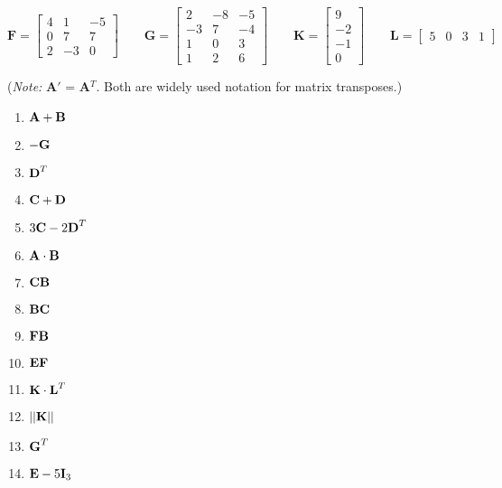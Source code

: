 \documentclass[12pt]{article}
\begin{document}
\begin{equation*}
\textbf{F} = \left[\begin{array}{rrr}
4 & 1 & -5\\
0 & 7 & 7\\
2 & -3 & 0
\end{array}\right]
\qquad
\textbf{G} = \left[\begin{array}{rrr}
2 & -8 & -5\\
-3 & 7 & -4\\
1 & 0 & 3\\
1 & 2 & 6
\end{array}\right]
\qquad
\textbf{K} = \left[\begin{array}{rrr}
9 \\ -2 \\ -1 \\ 0
\end{array}\right]
\qquad
\textbf{L} = \begin{bmatrix}
5 & 0 & 3 & 1
\end{bmatrix}
\end{equation*}

({\it Note:} \textbf{A}$'$ = \textbf{A}$^T$. Both are widely used notation for matrix transposes.)

\begin{minipage}[t]{0.5\textwidth}
\begin{enumerate}
\item $\textrm{\textbf{A}} + \textrm{\textbf{B}}$
\item $-\textrm{\textbf{G}}$
\item $\textrm{\textbf{D}}^T$
\item $\textrm{\textbf{C}}+\textrm{\textbf{D}}$ %
\item $3\textrm{\textbf{C}} - 2\textrm{\textbf{D}}^T$
\item $\textrm{\textbf{A}} \cdot \textrm{\textbf{B}}$
\item $\textrm{\textbf{CB}}$
\end{enumerate}
\end{minipage}
\begin{minipage}[t]{0.5\textwidth}
\begin{enumerate}
\setcounter{enumi}{7}
\item $\textrm{\textbf{BC}}$ %
\item $\textrm{\textbf{FB}}$
\item $\textrm{\textbf{EF}}$
\item $\textrm{\textbf{K}} \cdot \textrm{\textbf{L}}^T$
\item $||\textrm{\textbf{K}}||$
\item $\textrm{\textbf{G}}^T$
\item $\textrm{\textbf{E}} - 5\textrm{\textbf{I}}_3$
\end{enumerate}
\end{minipage}
\end{document}
